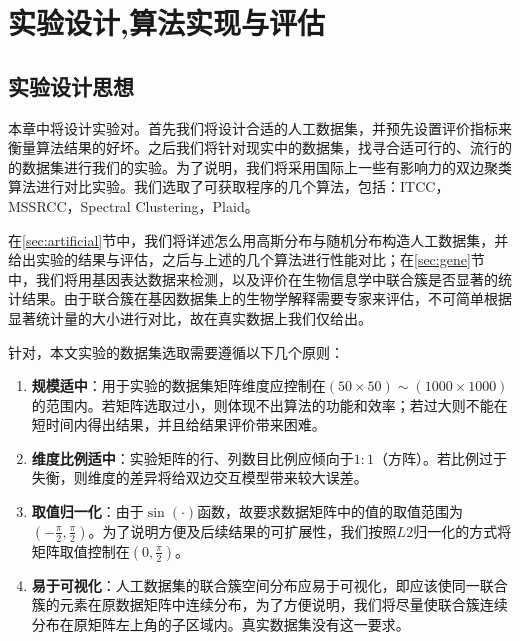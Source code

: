 
\chapter{实验设计,算法实现与评估}
\label{chapter:experiment}
\section{实验设计思想}
\label{sec:experiment}
本章中将设计实验对。首先我们将设计合适的人工数据集，并预先设置评价指标来衡量算法结果的好坏。之后我们将针对现实中的数据集，找寻合适可行的、流行的的数据集进行我们的实验。为了说明，我们将采用国际上一些有影响力的双边聚类算法进行对比实验。我们选取了可获取程序的几个算法，包括：ITCC\cite{dhillon2003information}，MSSRCC\cite{cho2008coclustering}，Spectral Clustering\cite{kluger2003spectral}，Plaid\cite{lazzeroni2002plaid}。

在\ref{sec:artificial}节中，我们将详述怎么用高斯分布与随机分布构造人工数据集，并给出实验的结果与评估，之后与上述的几个算法进行性能对比；在\ref{sec:gene}节中，我们将用基因表达数据来检测，以及评价在生物信息学中联合簇是否显著的统计结果。由于联合簇在基因数据集上的生物学解释需要专家来评估，不可简单根据显著统计量的大小进行对比，故在真实数据上我们仅给出。

\vspace{2mm}
针对，本文实验的数据集选取需要遵循以下几个原则：
\begin{enumerate}
\item \textbf{规模适中}：用于实验的数据集矩阵维度应控制在$(50\times50)\sim(1000\times1000)$的范围内。若矩阵选取过小，则体现不出算法的功能和效率；若过大则不能在短时间内得出结果，并且给结果评价带来困难。
\item \textbf{维度比例适中}：实验矩阵的行、列数目比例应倾向于$1:1$（方阵）。若比例过于失衡，则维度的差异将给双边交互模型带来较大误差。
\item \textbf{取值归一化}：由于$\sin(\cdot)$函数，故要求数据矩阵中的值的取值范围为$(-\frac{\pi}{2},\frac{\pi}{2})$。为了说明方便及后续结果的可扩展性，我们按照$L2$归一化的方式将矩阵取值控制在$(0,\frac{\pi}{2})$。
\item \textbf{易于可视化}：人工数据集的联合簇空间分布应易于可视化，即应该使同一联合簇的元素在原数据矩阵中连续分布，为了方便说明，我们将尽量使联合簇连续分布在原矩阵左上角的子区域内。真实数据集没有这一要求。
\end{enumerate}

